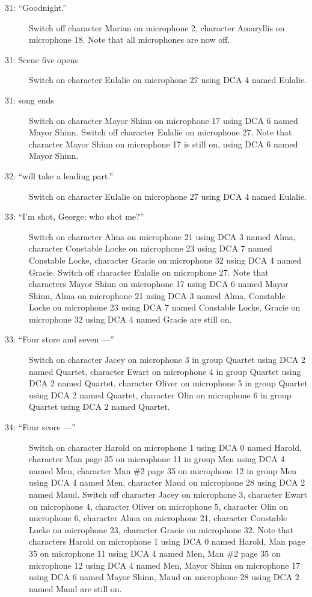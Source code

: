 \begin{description}
\item[31: ``Goodnight.'']
Switch off character Marian on microphone 2, character Amaryllis on microphone 18. Note that all microphones are now off.

\item[31: Scene five opens]
Switch on character Eulalie on microphone 27 using DCA 4 named Eulalie. 

\item[31: song ends]
Switch on character Mayor Shinn on microphone 17 using DCA 6 named Mayor Shinn. Switch off character Eulalie on microphone 27. Note that character Mayor Shinn on microphone 17 is still on, using DCA 6 named Mayor Shinn.

\item[32: ``will take a leading part.'']
Switch on character Eulalie on microphone 27 using DCA 4 named Eulalie. 

\item[33: ``I'm shot, George; who shot me?'']
Switch on character Alma on microphone 21 using DCA 3 named Alma, character Constable Locke on microphone 23 using DCA 7 named Constable Locke, character Gracie on microphone 32 using DCA 4 named Gracie. Switch off character Eulalie on microphone 27. Note that characters Mayor Shinn on microphone 17 using DCA 6 named Mayor Shinn, Alma on microphone 21 using DCA 3 named Alma, Constable Locke on microphone 23 using DCA 7 named Constable Locke, Gracie on microphone 32 using DCA 4 named Gracie are still on.  

\item[33: ``Four store and seven ---'']
Switch on character Jacey on microphone 3 in group Quartet using DCA 2 named Quartet, character Ewart on microphone 4 in group Quartet using DCA 2 named Quartet, character Oliver on microphone 5 in group Quartet using DCA 2 named Quartet, character Olin on microphone 6 in group Quartet using DCA 2 named Quartet. 

\item[34: ``Four score ---'']
Switch on character Harold on microphone 1 using DCA 0 named Harold, character Man page 35 on microphone 11 in group Men using DCA 4 named Men, character Man \#2 page 35 on microphone 12 in group Men using DCA 4 named Men, character Maud on microphone 28 using DCA 2 named Maud. Switch off character Jacey on microphone 3, character Ewart on microphone 4, character Oliver on microphone 5, character Olin on microphone 6, character Alma on microphone 21, character Constable Locke on microphone 23, character Gracie on microphone 32. Note that characters Harold on microphone 1 using DCA 0 named Harold, Man page 35 on microphone 11 using DCA 4 named Men, Man \#2 page 35 on microphone 12 using DCA 4 named Men, Mayor Shinn on microphone 17 using DCA 6 named Mayor Shinn, Maud on microphone 28 using DCA 2 named Maud are still on.  


\end{description}
